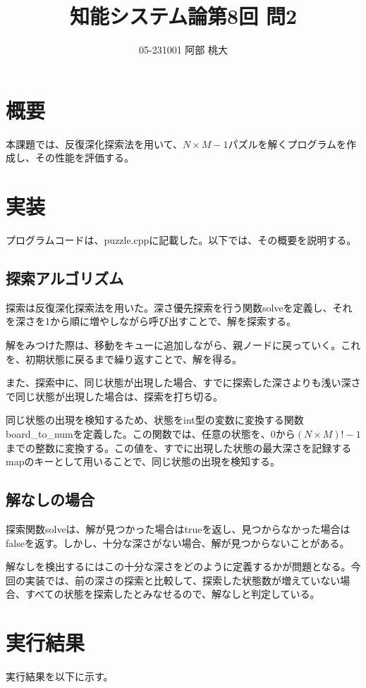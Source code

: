 \documentclass[a4paper,11pt]{ltjsarticle}
\begin{document}
\title{知能システム論第8回 問2}
\author{ 05-231001 阿部 桃大}
\maketitle

\section{概要}
本課題では、反復深化探索法を用いて、$N \times M -1$パズルを解くプログラムを作成し、その性能を評価する。

\section{実装}
プログラムコードは、puzzle.cppに記載した。以下では、その概要を説明する。

\subsection{探索アルゴリズム}
探索は反復深化探索法を用いた。深さ優先探索を行う関数solveを定義し、それを深さを1から順に増やしながら呼び出すことで、解を探索する。

解をみつけた際は、移動をキューに追加しながら、親ノードに戻っていく。これを、初期状態に戻るまで繰り返すことで、解を得る。

また、探索中に、同じ状態が出現した場合、すでに探索した深さよりも浅い深さで同じ状態が出現した場合は、探索を打ち切る。

同じ状態の出現を検知するため、状態をint型の変数に変換する関数board\_to\_numを定義した。この関数では、任意の状態を、0から$(N\times M) ! -1$までの整数に変換する。この値を、すでに出現した状態の最大深さを記録するmapのキーとして用いることで、同じ状態の出現を検知する。

\subsection{解なしの場合}
探索関数solveは、解が見つかった場合はtrueを返し、見つからなかった場合はfalseを返す。しかし、十分な深さがない場合、解が見つからないことがある。

解なしを検出するにはこの十分な深さをどのように定義するかが問題となる。今回の実装では、前の深さの探索と比較して、探索した状態数が増えていない場合、すべての状態を探索したとみなせるので、解なしと判定している。

\section{実行結果}
実行結果を以下に示す。
\end{document}
